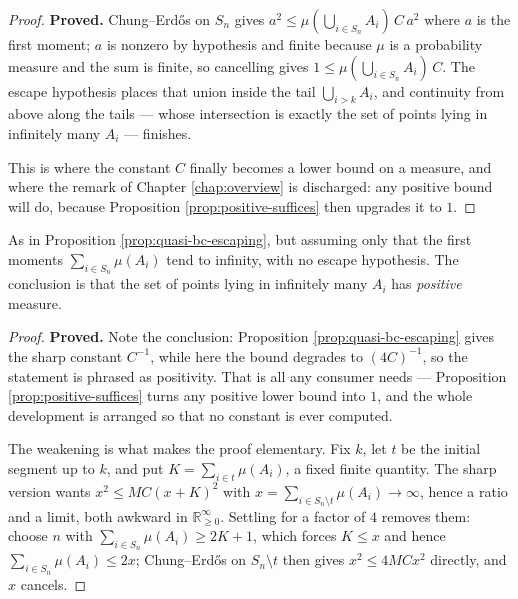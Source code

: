 \begin{proof}
  \leanok
  \textbf{Proved.} Chung--Erd\H{o}s on $S_n$ gives
  $a^2 \leq \mu(\bigcup_{i \in S_n} A_i)\,C\,a^2$ where $a$ is the first moment; $a$ is
  nonzero by hypothesis and finite because $\mu$ is a probability measure and the sum is
  finite, so cancelling gives $1 \leq \mu(\bigcup_{i \in S_n} A_i)\,C$. The escape
  hypothesis places that union inside the tail $\bigcup_{i > k} A_i$, and continuity from
  above along the tails --- whose intersection is exactly the set of points lying in
  infinitely many $A_i$ --- finishes.

  This is where the constant $C$ finally becomes a lower bound on a measure, and where
  the remark of Chapter \ref{chap:overview} is discharged: any positive bound will do,
  because Proposition \ref{prop:positive-suffices} then upgrades it to $1$.
\end{proof}

\begin{proposition}
  \label{prop:quasi-bc}
  \leanok
  As in Proposition \ref{prop:quasi-bc-escaping}, but assuming only that the first moments
  $\sum_{i \in S_n} \mu(A_i)$ tend to infinity, with no escape hypothesis. The conclusion
  is that the set of points lying in infinitely many $A_i$ has \emph{positive} measure.
\end{proposition}

\begin{proof}
  \leanok
  \textbf{Proved.} Note the conclusion: Proposition \ref{prop:quasi-bc-escaping} gives the
  sharp constant $C^{-1}$, while here the bound degrades to $(4C)^{-1}$, so the statement
  is phrased as positivity. That is all any consumer needs --- Proposition
  \ref{prop:positive-suffices} turns any positive lower bound into $1$, and the whole
  development is arranged so that no constant is ever computed.

  The weakening is what makes the proof elementary. Fix $k$, let $t$ be the initial
  segment up to $k$, and put $K = \sum_{i \in t} \mu(A_i)$, a fixed finite quantity. The
  sharp version wants $x^2 \leq MC(x+K)^2$ with $x = \sum_{i \in S_n \setminus t} \mu(A_i)
  \to \infty$, hence a ratio and a limit, both awkward in
  $\mathbb{R}_{\geq 0}^{\infty}$. Settling for a factor of $4$ removes them: choose $n$
  with $\sum_{i \in S_n} \mu(A_i) \geq 2K + 1$, which forces $K \leq x$ and hence
  $\sum_{i \in S_n} \mu(A_i) \leq 2x$; Chung--Erd\H{o}s on $S_n \setminus t$ then gives
  $x^2 \leq 4 M C x^2$ directly, and $x$ cancels.
\end{proof}

